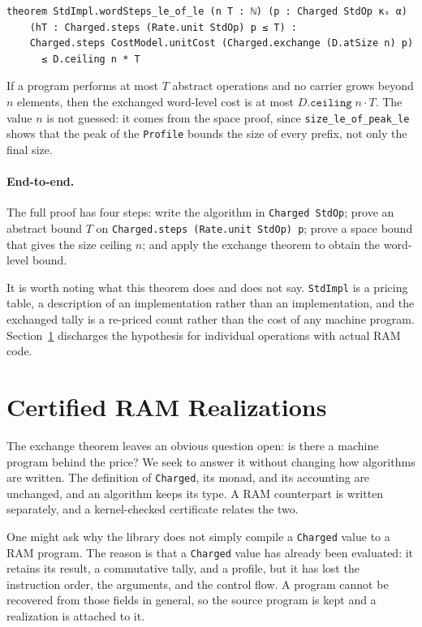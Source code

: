 \documentclass[acmsmall,nonacm]{acmart}
\begin{document}
\begin{lstlisting}
theorem StdImpl.wordSteps_le_of_le (n T : ℕ) (p : Charged StdOp κₛ α)
    (hT : Charged.steps (Rate.unit StdOp) p ≤ T) :
    Charged.steps CostModel.unitCost (Charged.exchange (D.atSize n) p)
      ≤ D.ceiling n * T
\end{lstlisting}

If a program performs at most $T$ abstract operations and no carrier grows beyond $n$ elements, then the exchanged word-level cost is at most $D.\texttt{ceiling}\;n \cdot T$.
The value $n$ is not guessed: it comes from the space proof, since \lstinline{size_le_of_peak_le} shows that the peak of the \lstinline{Profile} bounds the size of every prefix, not only the final size.

\paragraph{End-to-end.}
The full proof has four steps: write the algorithm in \lstinline{Charged StdOp}; prove an abstract bound $T$ on \lstinline{Charged.steps (Rate.unit StdOp) p}; prove a space bound that gives the size ceiling $n$; and apply the exchange theorem to obtain the word-level bound.

It is worth noting what this theorem does and does not say.
\lstinline{StdImpl} is a pricing table, a description of an implementation rather than an implementation, and the exchanged tally is a re-priced count rather than the cost of any machine program.
Section~\ref{sec:realizations} discharges the hypothesis for individual operations with actual RAM code.


\section{Certified RAM Realizations}\label{sec:realizations}

The exchange theorem leaves an obvious question open: is there a machine program behind the price?
We seek to answer it without changing how algorithms are written.
The definition of \lstinline{Charged}, its monad, and its accounting are unchanged, and an algorithm keeps its type.
A RAM counterpart is written separately, and a kernel-checked certificate relates the two.

One might ask why the library does not simply compile a \lstinline{Charged} value to a RAM program.
The reason is that a \lstinline{Charged} value has already been evaluated: it retains its result, a commutative tally, and a profile, but it has lost the instruction order, the arguments, and the control flow.
A program cannot be recovered from those fields in general, so the source program is kept and a realization is attached to it.
\end{document}
